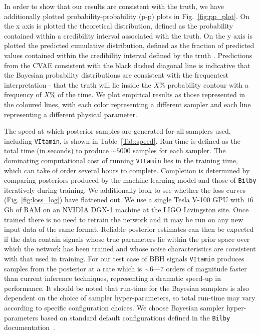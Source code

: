 \documentclass[%
showpacs,
 amsmath,amssymb,
 aps,
 twocolumn,
 prl,
 reprint,
floatfix,
]{revtex4-1}
\newcommand{\chris}[1]{\textbf{\textcolor{red}{CHRIS: #1}}}
\begin{document}
%
%
In order to show that our results are consistent with the truth, we have
additionally plotted probability-probability (p-p) plots in
Fig.~\ref{fig:pp_plot}. On the x axis is plotted the theoretical distribution, 
defined as the probability contained within a credibility interval associated 
with the truth. 
On the y axis is plotted the predicted cumulative
distribution, defined as the fraction of predicted values contained within 
the credibility interval defined by the truth \cite{1409.7215}.
Predictions from the \ac{CVAE} consistent with the black dashed diagonal line
is indicative that the Bayesian probability distributions are consistent with
the frequentest interpretation - that the truth will lie inside the $X\%$
probability contour with a frequency of $X\%$ of the time.  We plot empirical
results as those represented in the coloured lines, with each color representing 
a different sampler and each line representing a different physical parameter. 

%
%
The speed at which posterior samples are generated for all samplers used,
including \texttt{VItamin}, is shown in Table~\ref{Tab:speed}. Run-time is
defined as the total time (in seconds) to produce $\sim 5000$ samples for each
sampler. The dominating computational cost of running \texttt{VItamin} lies in
the training time, which can take of order several hours to complete.
Completion is determined by comparing posteriors produced by the machine
learning model and those of \texttt{Bilby} iteratively during training. We
additionally look to see whether the loss curves (Fig. \ref{fig:loss_log}) have
flattened out. We use a single Tesla V-100 GPU with $16$ Gb of RAM on an NVIDIA
DGX-1 machine at the LIGO Livingston site.  Once trained there is no need to
retrain the network and it may be run on any new input data of the same format.
Reliable posterior estimates can then be expected if the data contain signals
whose true parameters lie within the prior space over which the network has
been trained and whose noise characteristics are consistent with that used in
training. For our test case of \ac{BBH} signals \texttt{VItamin} produces
samples from the posterior at a rate which is $\sim 6$---$7$ orders of
magnitude faster than current inference techniques, representing a dramatic
speed-up in performance. It should be noted that run-time for the Bayesian
samplers is also dependent on the choice of sampler hyper-parameters, so total
run-time may vary according to specific configuration choices. We choose
Bayesian sampler hyper-parameters based on standard default configurations
defined in the \texttt{Bilby} documentation~\cite{1811.02042}. 
 
\end{document}
